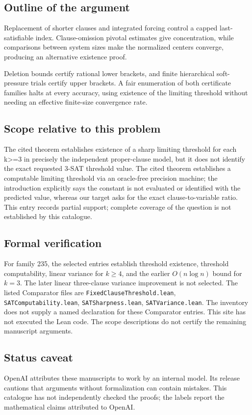 \documentclass[11pt]{article}
\begin{document}
\subsection{Outline of the argument}
Replacement of shorter clauses and integrated forcing control a capped last-satisfiable index. Clause-omission pivotal estimates give concentration, while comparisons between system sizes make the normalized centers converge, producing an alternative existence proof.

Deletion bounds certify rational lower brackets, and finite hierarchical soft-pressure trials certify upper brackets. A fair enumeration of both certificate families halts at every accuracy, using existence of the limiting threshold without needing an effective finite-size convergence rate.

\subsection{Scope relative to this problem}
The cited theorem establishes existence of a sharp limiting threshold for each k>=3 in precisely the independent proper-clause model, but it does not identify the exact requested 3-SAT threshold value. The cited theorem establishes a computable limiting threshold via an oracle-free precision machine; the introduction explicitly says the constant is not evaluated or identified with the predicted value, whereas our target asks for the exact clause-to-variable ratio. This entry records partial support; complete coverage of the question is not established by this catalogue.

\subsection{Formal verification}
For family 235, the selected entries establish threshold existence, threshold computability, linear variance for $k\geq4$, and the earlier $O(n\log n)$ bound for $k=3$. The later linear three-clause variance improvement is not selected. The listed Comparator files are \texttt{FixedClauseThreshold.lean}, \texttt{SATComputability.lean}, \texttt{SATSharpness.lean}, \texttt{SATVariance.lean}. The inventory does not supply a named declaration for these Comparator entries. This site has not executed the Lean code. The scope descriptions do not certify the remaining manuscript arguments.

\subsection{Status caveat}
OpenAI attributes these manuscripts to work by an internal model. Its release cautions that arguments without formalization can contain mistakes. This catalogue has not independently checked the proofs; the labels report the mathematical claims attributed to OpenAI.
\end{document}
